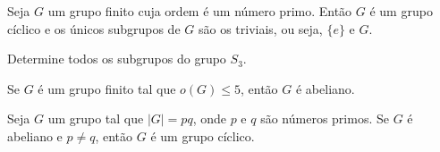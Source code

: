 \documentclass{beamer}
\begin{document}
    \begin{frame}
        \begin{corolario}
            Seja $G$ um grupo finito \pause cuja ordem é um número primo. \pause Então $G$ é um grupo cíclico \pause e os únicos subgrupos de $G$ \pause são os triviais, \pause ou seja, $\{e\}$ e $G$.
        \end{corolario}
    \end{frame}

    \begin{frame}
        \begin{exemplo}
            Determine todos os subgrupos do grupo $S_3$.
        \end{exemplo}
    \end{frame}

    \begin{frame}
        \begin{proposicao}
            Se $G$ é um grupo finito tal que $o(G) \le 5$, então $G$ é abeliano.
        \end{proposicao}
    \end{frame}

    \begin{frame}
        \begin{proposicao}
            Seja $G$ um grupo tal que $|G| = pq$, onde $p$ e $q$ são números primos. Se $G$ é abeliano e $p \ne q$, então $G$ é um grupo cíclico.
        \end{proposicao}
    \end{frame}
\end{document}
